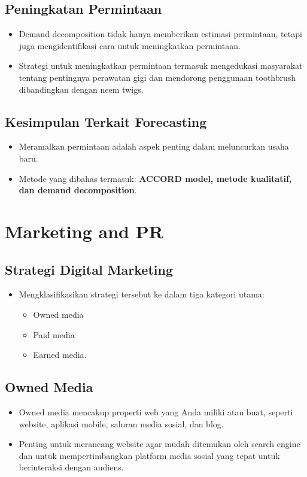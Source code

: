 \documentclass{article}
\begin{document}
\subsection{Peningkatan Permintaan}
\begin{itemize}
    \item Demand decomposition tidak hanya memberikan estimasi permintaan, tetapi juga mengidentifikasi cara untuk meningkatkan permintaan.
    \item Strategi untuk meningkatkan permintaan termasuk mengedukasi masyarakat tentang pentingnya perawatan gigi dan mendorong penggunaan toothbrush dibandingkan dengan neem twigs.
\end{itemize}

\subsection{Kesimpulan Terkait Forecasting}
\begin{itemize}
    \item Meramalkan permintaan adalah aspek penting dalam meluncurkan usaha baru.
    \item Metode yang dibahas termasuk: \textbf{ACCORD model, metode kualitatif, dan demand decomposition}.
\end{itemize}

\section{Marketing and PR}
\subsection{Strategi Digital Marketing}
\begin{itemize}
    \item Mengklasifikasikan strategi tersebut ke dalam tiga kategori utama:
          \begin{itemize}
              \item Owned media
              \item Paid media
              \item Earned media.
          \end{itemize}
\end{itemize}

\subsection{Owned Media}
\begin{itemize}
    \item Owned media mencakup properti web yang Anda miliki atau buat, seperti website, aplikasi mobile, saluran media sosial, dan blog.
    \item Penting untuk merancang website agar mudah ditemukan oleh search engine dan untuk mempertimbangkan platform media sosial yang tepat untuk berinteraksi dengan audiens.
\end{itemize}
\end{document}
